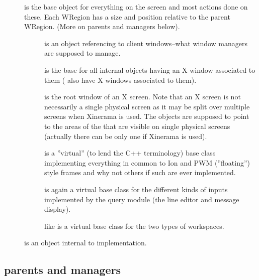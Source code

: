 \begin{description}
  \item[]
    is the base object for everything on the screen
    and most actions done on these. Each WRegion has a size and position
    relative to the parent WRegion. (More on parents and managers
    below).
    \begin{description}
      \item[] is an object
	referencing to client windows--what window managers are supposed
	to manage.
	
      \item[] is the base for all internal
	objects having an X window associated to them (
	also have X windows associated to them).
	
      \item[] is the root window of an
	X screen. Note that an X screen is not necessarily a single physical
	screen as it may be split over multiple screens when Xinerama is
	used. The  objects are supposed to point to the
	areas of the  that are visible on single physical
	screens (actually there can be only one  if Xinerama
	is used).
	
      \item[] is a ''virtual'' (to
	lend the C++ terminology) base class implementing everything in
	common to Ion and PWM (''floating'') style frames and why not others
	if such are ever implemented.
	
      \item[] is again a virtual base class
	for the different kinds of inputs implemented by the query module
	(the line editor and message display).
	
      \item[] like  is a
	virtual base class for the two types of workspaces.
    \end{description}
    
  \item[] is an object internal to
     implementation.
\end{description}


\subsection{ parents and managers}

